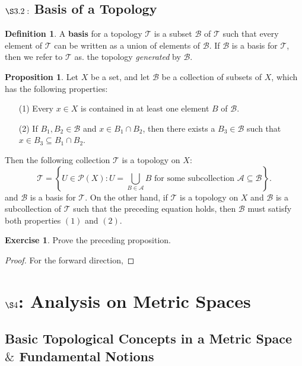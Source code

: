 \documentclass[9pt,reqno]{amsart}
\theoremstyle{definition}
\newtheorem{defi}{Definition}[section]
\newtheorem{exercise}{Exercise}[section]
\newtheorem{prop}{Proposition}[section]
\begin{document}
\subsection{$\S 3.2:$ Basis of a Topology}
\begin{defi}
A \textbf{basis} for a topology $\mathcal T$ is a subset $\mathcal B$ of $\mathcal T$ such that every element of $\mathcal T$ can be written as a union of elements of $\mathcal B$. If $\mathcal B$ is a basis for $\mathcal T$, then we refer to $\mathcal T$ as. the topology \textit{generated} by $\mathcal B$.	
\end{defi}
\begin{prop}
Let $X$ be a set, and let $\mathcal B$ be a collection of subsets of $X$, which has the following properties: 
\begin{itemize}
	\item [(1)] Every $x \in X$ is contained in at least one element $B$ of $\mathcal B$.
	\item [(2)] If $B_1, B_2 \in \mathcal B$ and $x \in B_1 \cap B_2$, then there exists a $B_3 \in \mathcal B$ such that $x \in B_3 \subseteq B_1 \cap B_2$.
\end{itemize}
Then the following collection $\mathcal T$ is a topology on $X$: 
\[ \mathcal T = \left \{ U \in \mathcal P(X) \colon U = \bigcup _{B \in \mathcal A} B \text{ for some subcollection } \mathcal A \subseteq \mathcal B \right \}.
\]
and $\mathcal B$ is a basis for $\mathcal T$. On the other hand, if $\mathcal T$ is a topology on $X$ and $\mathcal B$ is a subcollection of $\mathcal T$ such that the preceding equation holds, then $\mathcal B$ must satisfy both properties $(1)$ and $(2)$.
\end{prop}
\begin{exercise} Prove the preceding proposition.
\end{exercise}
\begin{proof} 
For the forward direction, 
\end{proof}

\section{$\S 4$: Analysis on Metric Spaces}
\subsection{Basic Topological Concepts in a Metric Space $\&$ Fundamental Notions}
\end{document}
